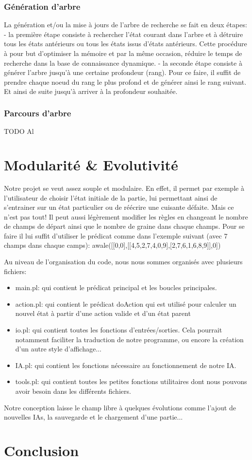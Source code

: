 \documentclass[]{article}
\begin{document}
\subsubsection{Génération d'arbre}

La génération et/ou la mise à jours de l'arbre de recherche se fait en deux étapes:
	- la première étape consiste à rechercher l'état courant dans l'arbre et à détruire tous les états antérieurs ou tous les états issus d'états antérieurs. Cette procédure à pour but d'optimiser la mémoire et par la même occasion, réduire le temps de recherche dans la base de connaissance dynamique.
	- la seconde étape consiste à générer l'arbre jusqu'à une certaine profondeur (rang). Pour ce faire, il suffit de prendre chaque noeud du rang le plus profond et de générer ainsi le rang suivant. Et ainsi de suite jusqu'à arriver à la profondeur souhaitée.

\subsubsection{Parcours d'arbre}

TODO Al

\section{Modularité \& Evolutivité}

Notre projet se veut assez souple et modulaire. En effet, il permet par exemple à l'utilisateur de choisir l'état initiale de la partie, lui permettant ainsi de s'entrainer sur un état particulier ou de réécrire une cuisante défaite.
Mais ce n'est pas tout! Il peut aussi légèrement modifier les règles en changeant le nombre de champs de départ ainsi que le nombre de graine dans chaque champs. Pour se faire il lui suffit d'utiliser le prédicat comme dans l'exemple suivant (avec 7 champs dans chaque camps):
	awale([[0,0],[[4,5,2,7,4,0,9],[2,7,6,1,6,8,9]],0])
	
Au niveau de l'organisation du code, nous nous sommes organisés avec plusieurs fichiers:
\begin{itemize}
\item main.pl:		qui contient le prédicat principal et les boucles principales.
\item action.pl:		qui contient le prédicat doAction qui est utilisé pour calculer un nouvel état à partir d'une action valide et d'un état parent
\item io.pl:			qui contient toutes les fonctions d'entrées/sorties. Cela pourrait notamment faciliter la traduction de notre programme, ou encore la création d'un autre style d'affichage...
\item IA.pl:			qui contient les fonctions nécessaire au fonctionnement de notre IA.
\item tools.pl:		qui contient toutes les petites fonctions utilitaires dont nous pouvons avoir besoin dans les différents fichiers.
\end{itemize}


	
Notre conception laisse le champ libre à quelques évolutions comme l'ajout de nouvelles IAs, la sauvegarde et le chargement d'une partie... 

\section{Conclusion}
\end{document}

